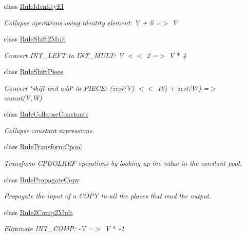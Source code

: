 \begin{DoxyCompactItemize}
class \mbox{\hyperlink{class_rule_identity_el}{Rule\+Identity\+El}}
\begin{DoxyCompactList}\small\item\em Collapse operations using identity element\+: {\ttfamily V + 0 =$>$ V} \end{DoxyCompactList}\item 
class \mbox{\hyperlink{class_rule_shift2_mult}{Rule\+Shift2\+Mult}}
\begin{DoxyCompactList}\small\item\em Convert I\+N\+T\+\_\+\+L\+E\+FT to I\+N\+T\+\_\+\+M\+U\+LT\+: {\ttfamily V $<$$<$ 2 =$>$ V $\ast$ 4} \end{DoxyCompactList}\item 
class \mbox{\hyperlink{class_rule_shift_piece}{Rule\+Shift\+Piece}}
\begin{DoxyCompactList}\small\item\em Convert \char`\"{}shift and add\char`\"{} to P\+I\+E\+CE\+: (zext(\+V) $<$$<$ 16) + zext(\+W) =$>$ concat(\+V,\+W) \end{DoxyCompactList}\item 
class \mbox{\hyperlink{class_rule_collapse_constants}{Rule\+Collapse\+Constants}}
\begin{DoxyCompactList}\small\item\em Collapse constant expressions. \end{DoxyCompactList}\item 
class \mbox{\hyperlink{class_rule_transform_cpool}{Rule\+Transform\+Cpool}}
\begin{DoxyCompactList}\small\item\em Transform C\+P\+O\+O\+L\+R\+EF operations by looking up the value in the constant pool. \end{DoxyCompactList}\item 
class \mbox{\hyperlink{class_rule_propagate_copy}{Rule\+Propagate\+Copy}}
\begin{DoxyCompactList}\small\item\em Propagate the input of a C\+O\+PY to all the places that read the output. \end{DoxyCompactList}\item 
class \mbox{\hyperlink{class_rule2_comp2_mult}{Rule2\+Comp2\+Mult}}
\begin{DoxyCompactList}\small\item\em Eliminate I\+N\+T\+\_\+C\+O\+MP\+: {\ttfamily -\/V =$>$ V $\ast$ -\/1} \end{DoxyCompactList}\item 

\end{DoxyCompactItemize}
